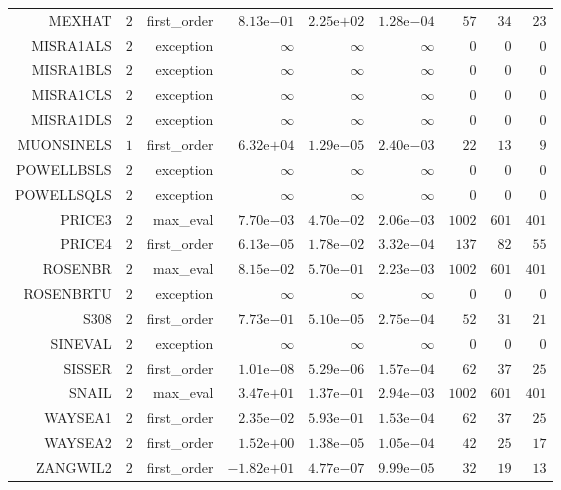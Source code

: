 \begin{longtable}{rrrrrrrrr}
MEXHAT & \(     2\) & first\_order & \( 8.13\)e\(-01\) & \( 2.25\)e\(+02\) & \( 1.28\)e\(-04\) & \(    57\) & \(    34\) & \(    23\) \\
MISRA1ALS & \(     2\) & exception & \(\infty\) & \(\infty\) & \(\infty\) & \(     0\) & \(     0\) & \(     0\) \\
MISRA1BLS & \(     2\) & exception & \(\infty\) & \(\infty\) & \(\infty\) & \(     0\) & \(     0\) & \(     0\) \\
MISRA1CLS & \(     2\) & exception & \(\infty\) & \(\infty\) & \(\infty\) & \(     0\) & \(     0\) & \(     0\) \\
MISRA1DLS & \(     2\) & exception & \(\infty\) & \(\infty\) & \(\infty\) & \(     0\) & \(     0\) & \(     0\) \\
MUONSINELS & \(     1\) & first\_order & \( 6.32\)e\(+04\) & \( 1.29\)e\(-05\) & \( 2.40\)e\(-03\) & \(    22\) & \(    13\) & \(     9\) \\
POWELLBSLS & \(     2\) & exception & \(\infty\) & \(\infty\) & \(\infty\) & \(     0\) & \(     0\) & \(     0\) \\
POWELLSQLS & \(     2\) & exception & \(\infty\) & \(\infty\) & \(\infty\) & \(     0\) & \(     0\) & \(     0\) \\
PRICE3 & \(     2\) & max\_eval & \( 7.70\)e\(-03\) & \( 4.70\)e\(-02\) & \( 2.06\)e\(-03\) & \(  1002\) & \(   601\) & \(   401\) \\
PRICE4 & \(     2\) & first\_order & \( 6.13\)e\(-05\) & \( 1.78\)e\(-02\) & \( 3.32\)e\(-04\) & \(   137\) & \(    82\) & \(    55\) \\
ROSENBR & \(     2\) & max\_eval & \( 8.15\)e\(-02\) & \( 5.70\)e\(-01\) & \( 2.23\)e\(-03\) & \(  1002\) & \(   601\) & \(   401\) \\
ROSENBRTU & \(     2\) & exception & \(\infty\) & \(\infty\) & \(\infty\) & \(     0\) & \(     0\) & \(     0\) \\
S308 & \(     2\) & first\_order & \( 7.73\)e\(-01\) & \( 5.10\)e\(-05\) & \( 2.75\)e\(-04\) & \(    52\) & \(    31\) & \(    21\) \\
SINEVAL & \(     2\) & exception & \(\infty\) & \(\infty\) & \(\infty\) & \(     0\) & \(     0\) & \(     0\) \\
SISSER & \(     2\) & first\_order & \( 1.01\)e\(-08\) & \( 5.29\)e\(-06\) & \( 1.57\)e\(-04\) & \(    62\) & \(    37\) & \(    25\) \\
SNAIL & \(     2\) & max\_eval & \( 3.47\)e\(+01\) & \( 1.37\)e\(-01\) & \( 2.94\)e\(-03\) & \(  1002\) & \(   601\) & \(   401\) \\
WAYSEA1 & \(     2\) & first\_order & \( 2.35\)e\(-02\) & \( 5.93\)e\(-01\) & \( 1.53\)e\(-04\) & \(    62\) & \(    37\) & \(    25\) \\
WAYSEA2 & \(     2\) & first\_order & \( 1.52\)e\(+00\) & \( 1.38\)e\(-05\) & \( 1.05\)e\(-04\) & \(    42\) & \(    25\) & \(    17\) \\
ZANGWIL2 & \(     2\) & first\_order & \(-1.82\)e\(+01\) & \( 4.77\)e\(-07\) & \( 9.99\)e\(-05\) & \(    32\) & \(    19\) & \(    13\) \\\hline
\end{longtable}
